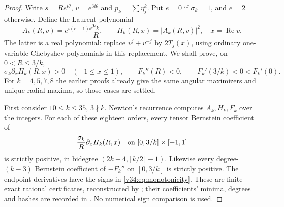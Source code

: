 \documentclass[UTF8,11pt]{ctexart}
\theoremstyle{definition}
\numberwithin{equation}{section}
\DeclareMathOperator{\Rea}{Re}\DeclareMathOperator{\Ima}{Im}
\begin{document}
\begin{proof}
Write $s=Re^{i\theta}$, $v=e^{3i\theta}$ and $p_k=\sum\eta_j^k$.
Put $e=0$ if $\sigma_k=1$, and $e=2$ otherwise. Define the
Laurent polynomial
\[
 A_k(R,v)=e^{i(e-1)\theta}\frac{p_k}{R},\qquad
 H_k(R,x)=|A_k(R,v)|^2,\quad x=\Rea v.
\]
The latter is a real polynomial: replace $v^j+v^{-j}$ by
$2T_j(x)$, using ordinary one-variable Chebyshev polynomials
in this replacement. We shall prove, on $0<R\le3/k$,
\begin{equation}\label{v34:eq:monotonicity}
 \sigma_k\partial_xH_k(R,x)>0\quad(-1\le x\le1),
 \qquad F_k''(R)<0,
 \qquad F_k'(3/k)<0<F_k'(0).
\end{equation}
For $k=4,5,7,8$ the earlier proofs already give the same angular
maximizers and unique radial maxima, so those cases are settled.

First consider $10\le k\le35$, $3\nmid k$. Newton's recurrence
computes $A_k,H_k,F_k$ over the integers. For each of these
eighteen orders, every tensor Bernstein coefficient of
\[
 \frac{\sigma_k}{R}\partial_xH_k(R,x)
 \quad\hbox{on }[0,3/k]\times[-1,1]
\]
is strictly positive, in bidegree
$(2k-4,\lfloor k/2\rfloor-1)$. Likewise every degree-$(k-3)$
Bernstein coefficient of $-F_k''$ on $[0,3/k]$ is strictly
positive. The endpoint derivatives have the signs in
\eqref{v34:eq:monotonicity}. These are finite exact rational
certificates, reconstructed by
; their coefficients'
minima, degrees and hashes are recorded in
.
No numerical sign comparison is used.


\end{proof}
\end{document}
